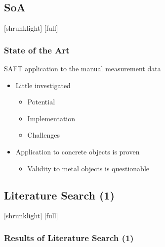 \documentclass[12pt,compress,aspectratio=169]{beamer} %
\begin{document}
\subsection{SoA}
[shrunklight]
[full]
\begin{frame}[t]
	\frametitle{State of the Art}
	SAFT application to the manual measurement data 	
	\begin{itemize}
		\item Little investigated 
		\begin{itemize}
			\item Potential
			\item Implementation 
			\item Challenges
		\end{itemize}
		\item Application to concrete objects is proven \footnotemark
		\begin{itemize}
			\item Validity to metal objects is questionable
		\end{itemize}
	\end{itemize}
	
\end{frame}


\subsection{Literature Search (1)}
[shrunklight]
[full]
\begin{frame}
	\frametitle{Results of Literature Search (1)}
	\centering
	\begin{table}
	\begin{center}
	\end{center}
	\end{table}
\end{frame}
\end{document}
